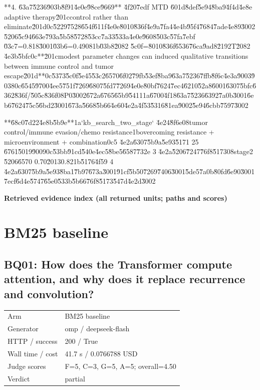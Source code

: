 \documentclass[10pt]{article}
\begin{document}
\begin{AnswerText}
**4. \u63a7\u5236\u903b\u8f91\u4e0e\u98ce\u9669**
\u4f20\u7edf MTD \u601d\u8def\u5e94\u8ba9\u4f4d\u4e8e adaptive therapy\u201ccontrol rather than eliminate\u201d\uff0c\u5229\u7528\u654f\u611f\u4e0e\u8010\u836f\u4e9a\u7fa4\u4e4b\u95f4\u7684\u7ade\u4e89\u3002\u5206\u5c94\u663e\u793a\u5b58\u5728\u53cc\u7a33\u533a\u4e0e\u9608\u503c\u57fa\u7ebf \u03c7=0.818\u3001\u03b6=0.4908\uff1b\u03b8\u2082 \u5c0f=\u8010\u836f\u6536\u76ca\u9ad8\u2192T\u2082 \u4e3b\u5bfc\uff0c**\u201cmodest parameter changes can induced qualitative transitions between immune control and tumor escape\u201d**\uff0c\u5373\u5c0f\u5e45\u53c2\u6570\u6f02\u79fb\u53ef\u8ba9\u63a7\u5236\u7ffb\u8f6c\u4e3a\u9003\u9038\uff0c\u6545\u9700\u4ee5\u751f\u7269\u6807\u5fd7\u7269\u4e0e\u80bf\u7624\u7ec4\u6210\u52a8\u6001\u6307\u5bfc\u6362\u836f/\u505c\u836f\uff08P0\u3002\u672a\u6765\u65b9\u5411\uff1a\u6700\u4f18\u63a7\u5236\u6392\u7a0b\u3001\u6eb6\u7624\u75c5\u6bd2\u3001\u673a\u5668\u5b66\u4e60\u4e2a\u4f53\u5316\u81ea\u9002\u5e94\u6cbb\u7597\u3002

**\u68c0\u7d22\u4e8b\u5b9e**\uff1a`kb_search_two_stage` \u4e24\u8f6e\uff08tumor control/immune evasion/chemo resistance\uff1bovercoming resistance + microenvironment + combination\uff0c5 \u4e2a\u6307\u5b9a\u5e93\u5171 25 \u6761\u5019\u9009\uff0c\u53bb\u91cd\u540e\u4ec5\u8be5\u6587\u732e 3 \u4e2a\u5206\u7247\u76f8\u5173\uff08stage2 \u5206\u6570 0.70\u20130.82\uff1b\u5176\u4f59 4 \u4e2a\u6307\u5b9a\u5e93\u8ba1\u7b97\u673a\u3001\u91cf\u5b50\u7269\u7406\u3001\u5de5\u7a0b\u80fd\u6e90\u3001\u7ecf\u6d4e\u5747\u65e0\u533b\u5b66\u76f8\u5173\u547d\u4e2d\u3002
\end{AnswerText}

\textbf{Retrieved evidence index (all returned units; paths and scores) }
\begin{EvidenceText}
\end{EvidenceText}
\section{BM25 baseline}
\subsection{BQ01: How does the Transformer compute attention, and why does it replace recurrence and convolution?}
\begin{tabular}{@{}ll@{}}
Arm & BM25 baseline\\
Generator & omp / deepseek-flash\\
HTTP / success & 200 / True\\
Wall time / cost & 41.7 s / 0.0766788 USD\\
Judge scores & F=5, C=3, G=5, A=5; overall=4.50\\
Verdict & partial\\
\end{tabular}
\end{document}
